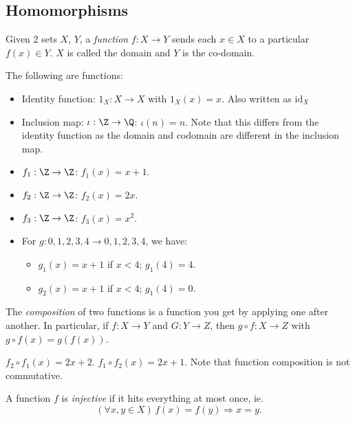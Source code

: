 \documentclass[a4paper]{article}
\begin{document}
\subsection{Homomorphisms}
\begin{defi}[Function]
  Given 2 sets $X$, $Y$, a \emph{function} $f: X \rightarrow Y$ sends each $x\in X$ to a particular $f(x)\in Y$. $X$ is called the domain and $Y$ is the co-domain.
\end{defi}
\begin{eg}
  The following are functions:
  \begin{itemize}
    \item Identity function: $1_X: X \rightarrow X$  with $1_X(x) = x$. Also written as $\mathrm{id}_X$
    \item Inclusion map: $\iota: \Z \rightarrow \Q$: $\iota(n) = n$. Note that this differs from the identity function as the domain and codomain are different in the inclusion map.
    \item $f_1: \Z \rightarrow \Z$: $f_1(x) = x + 1$.
    \item $f_2: \Z \rightarrow \Z$: $f_2(x) = 2x$.
    \item $f_3: \Z \rightarrow \Z$: $f_3(x) = x^2$.
    \item For $g: {0, 1, 2, 3, 4} \rightarrow {0, 1, 2, 3, 4}$, we have:
      \begin{itemize}
        \item $g_1(x) = x + 1$ if $x < 4$; $g_1(4) = 4$.
        \item $g_2(x) = x + 1$ if $x < 4$; $g_1(4) = 0$.
      \end{itemize}
  \end{itemize}
\end{eg}

\begin{defi}
  The \emph{composition} of two functions is a function you get by applying one after another. In particular, if $f: X \rightarrow Y$ and $G: Y\rightarrow Z$, then $g\circ f: X \rightarrow Z$ with $g\circ f(x) = g(f(x))$.
\end{defi}
\begin{eg}
  $f_2\circ f_1(x) = 2x + 2$. $f_1\circ f_2 (x) = 2x + 1$. Note that function composition is not commutative.
\end{eg}
\begin{defi}
  A function $f$ is \emph{injective} if it hits everything at most once, ie.
  \[
    (\forall x, y\in X)\,f(x) = f(y)\Rightarrow x = y.
  \]
\end{defi}
\end{document}
